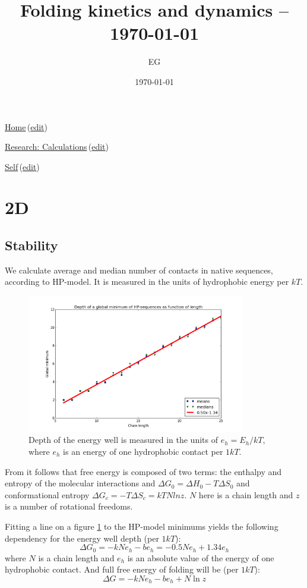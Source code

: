 \documentclass[12pt]{paper}
\title{Folding kinetics and dynamics -- \today}
\author{EG}
\date{\today}
\newcommand{\gD}{\Delta}
\newcommand{\wikilink}[2] { \href{#1.pdf}{#2}\,(\href{#1.tex}{edit})}
\begin{document}
 \maketitle
\wikilink{home}{Home}

\wikilink{research\_calculations}{Research: Calculations}

\wikilink{folding\_kinetics\_and\_dynamics}{Self}

\section{2D}
\subsection{Stability}\label{sec:stability}
We  calculate average and median number of contacts in native sequences, according to 
HP-model. It is measured in the units of hydrophobic energy per $kT$.
\begin{figure}[h!]
  \centering
  \includegraphics[width=0.85\textwidth]{pictures/hp-depth-length.png} 
  \caption{Depth of the energy well is measured in the units of $e_h=E_h/kT$, where $e_h$ is an 
energy of one hydrophobic contact per $1kT$.}
  \label{fig:hp-depth-length}
\end{figure}
From \cite{Ghosh2009} it follows that free energy is composed of two terms: the enthalpy and 
entropy of the molecular interactions and $\gD G_0=\gD H_0-T\gD S_0$ and conformational entropy 
$\gD G_c=-T\gD S_c=kTN ln z$. $N$ here is a chain length and $z$ is a number of rotational 
freedoms.

Fitting a line on a figure \ref{fig:hp-depth-length} to the HP-model minimums yields the following 
dependency for the energy well depth (per $1kT$):
\begin{equation}
\gD G_0= -kNe_h-be_h= -0.5Ne_h +1.34e_h
\end{equation} 
where $N$ is a chain length and $e_h$ is an absolute value of the energy 
of one hydrophobic contact.
And full free energy of folding will be (per $1kT$):
\begin{equation}
 \gD G = -kNe_h -be_h+N\ln z
\end{equation} 
\end{document}
